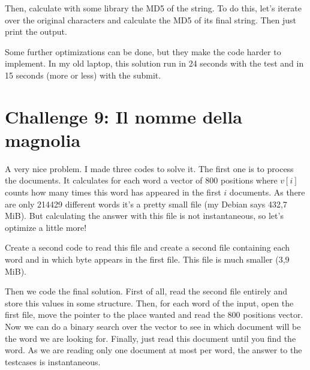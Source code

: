 \documentclass[english,12pt,a4paper]{article}
\begin{document}
Then, calculate with some library the MD5 of the string. To do this, let's iterate over the original characters and calculate the MD5 of its final string. Then just print the output.

Some further optimizations can be done, but they make the code harder to implement. In my old laptop, this solution run in 24 seconds with the test and in 15 seconds (more or less) with the submit.


\newpage

\section{Challenge 9: Il nomme della magnolia}
A very nice problem. I made three codes to solve it. The first one is to process the documents. It calculates for each word a vector of 800 positions where $v[i]$ counts how many times this word has appeared in the first $i$ documents. As there are only 214429 different words it's a pretty small file (my Debian says 432,7 MiB). But calculating the answer with this file is not instantaneous, so let's optimize a little more!

Create a second code to read this file and create a second file containing each word and in which byte appears in the first file. This file is much smaller (3,9 MiB).

Then we code the final solution. First of all, read the second file entirely and store this values in some structure. Then, for each word of the input, open the first file, move the pointer to the place wanted and read the 800 positions vector. Now we can do a binary search over the vector to see in which document will be the word we are looking for. Finally, just read this document until you find the word. As we are reading only one document at most per word, the answer to the testcases is instantaneous.

\newpage
\end{document}

